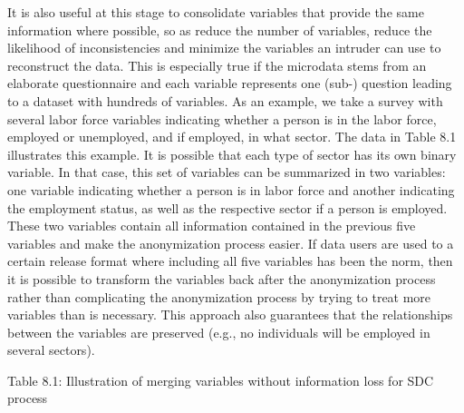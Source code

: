 \documentclass[letterpaper,10pt,english]{sphinxmanual}
\begin{document}
It is also useful at this stage to consolidate variables that provide
the same information where possible, so as reduce the number of
variables, reduce the likelihood of inconsistencies and minimize the
variables an intruder can use to reconstruct the data. This is
especially true if the microdata stems from an elaborate questionnaire
and each variable represents one (sub-) question leading to a dataset
with hundreds of variables. As an example, we take a survey with several
labor force variables indicating whether a person is in the labor force,
employed or unemployed, and if employed, in what sector. The data in
Table 8.1 illustrates this example. It is possible that each type of
sector has its own binary variable. In that case, this set of variables
can be summarized in two variables: one variable indicating whether a
person is in labor force and another indicating the employment status,
as well as the respective sector if a person is employed. These two
variables contain all information contained in the previous five
variables and make the anonymization process easier. If data users are
used to a certain release format where including all five variables has
been the norm, then it is possible to transform the variables back after
the anonymization process rather than complicating the anonymization
process by trying to treat more variables than is necessary. This
approach also guarantees that the relationships between the variables
are preserved (e.g., no individuals will be employed in several
sectors).

Table 8.1: Illustration of merging variables without information loss
for SDC process
\end{document}
